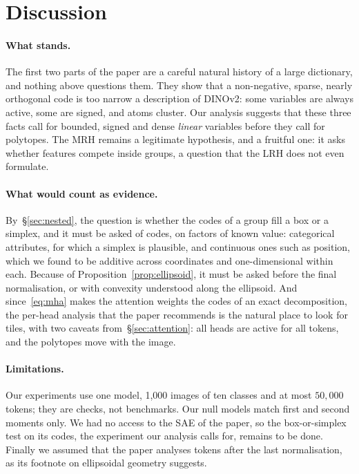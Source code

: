 \documentclass[sigconf,nonacm,screen]{acmart}
\begin{document}
\section{Discussion}
\label{sec:discussion}
\paragraph{What stands.} The first two parts of the paper are a careful natural history of a large
dictionary, and nothing above questions them. They show that a non-negative, sparse, nearly orthogonal
code is too narrow a description of DINOv2: some variables are always active, some are signed, and atoms
cluster. Our analysis suggests that these three facts call for bounded, signed and dense \emph{linear}
variables before they call for polytopes. The MRH remains a legitimate hypothesis, and a fruitful one:
it asks whether features compete inside groups, a question that the LRH does not even formulate.

\paragraph{What would count as evidence.} By~\S\ref{sec:nested}, the question is whether the codes of a
group fill a box or a simplex, and it must be asked of codes, on factors of known value: categorical
attributes, for which a simplex is plausible, and continuous ones such as position, which we found to be
additive across coordinates and one-dimensional within each. Because
of Proposition~\ref{prop:ellipsoid}, it must be asked before the final normalisation, or with convexity
understood along the ellipsoid. And since~\eqref{eq:mha} makes the attention weights the codes of an exact
decomposition, the per-head analysis that the paper recommends is the natural place to look for tiles,
with two caveats from~\S\ref{sec:attention}: all heads are active for all tokens, and the polytopes move
with the image.

\paragraph{Limitations.} Our experiments use one model, 1,000 images of ten classes and at most
$50{,}000$ tokens; they are checks, not benchmarks. Our null models match first and second moments only.
We had no access to the SAE of the paper, so the box-or-simplex test on its codes, the experiment our
analysis calls for, remains to be done. Finally we assumed that the paper analyses tokens after the last
normalisation, as its footnote on ellipsoidal geometry suggests.



\end{document}
